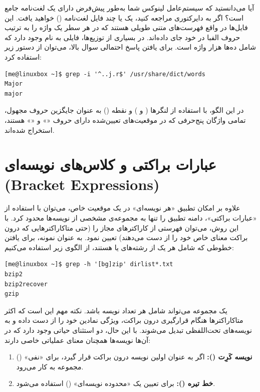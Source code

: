آیا می‌دانستید که سیستم‌عامل لینوکس شما به‌طور پیش‌فرض دارای یک لغت‌نامه جامع است؟ اگر به دایرکتوری  مراجعه کنید، یک یا چند فایل لغت‌نامه () خواهید یافت. این فایل‌ها در واقع فهرست‌های متنی طویلی هستند که در هر سطر یک واژه را به ترتیب حروف الفبا در خود جای داده‌اند. در بسیاری از توزیع‌ها، فایلی به نام  وجود دارد که شامل ده‌ها هزار واژه است. برای یافتن پاسخ احتمالی سوال بالا، می‌توان از دستور زیر استفاده کرد:

\begin{latin}
\begin{lstlisting}
[me@linuxbox ~]$ grep -i '^..j.r$' /usr/share/dict/words
Major
major
\end{lstlisting}
\end{latin}

در این الگو، با استفاده از لنگرها (\cmd{\^{}} و \cmd{\$}) و نقطه () به عنوان جایگزین حروف مجهول، تمامی واژگان پنج‌حرفی که در موقعیت‌های تعیین‌شده دارای حروف «» و «» هستند، استخراج شده‌اند.

\section{عبارات براکتی و کلاس‌های نویسه‌ای (Bracket Expressions)}

علاوه بر امکان تطبیق «هر نویسه‌ای» در یک موقعیت خاص، می‌توان با استفاده از «عبارات براکتی»، دامنه تطبیق را تنها به مجموعه‌ی مشخصی از نویسه‌ها محدود کرد. با این روش، می‌توان فهرستی از کاراکترهای مجاز را (حتی متاکاراکترهایی که درون براکت معنای خاص خود را از دست می‌دهند) تعیین نمود. به عنوان نمونه، برای یافتن خطوطی که شامل هر یک از رشته‌های  یا  هستند، از الگوی زیر استفاده می‌کنیم:

\begin{latin}
\begin{lstlisting}
[me@linuxbox ~]$ grep -h '[bg]zip' dirlist*.txt
bzip2
bzip2recover
gzip
\end{lstlisting}
\end{latin}

یک مجموعه می‌تواند شامل هر تعداد نویسه باشد. نکته مهم این است که اکثر متاکاراکترها هنگام قرارگیری درون براکت، ویژگی نمادین خود را از دست داده و به نویسه‌های تحت‌اللفظی تبدیل می‌شوند. با این حال، دو استثنای حیاتی وجود دارد که در آن‌ها نویسه‌ها همچنان معنای عملیاتی خاصی دارند:

\begin{enumerate}
  \item \textbf{نویسه کَرِت (\cmd{\^{}}):} اگر به عنوان اولین نویسه درون براکت قرار گیرد، برای «نفی» () مجموعه به کار می‌رود.
  \item \textbf{خط تیره (\cmd{-}):} برای تعیین یک «محدوده نویسه‌ای» () استفاده می‌شود.
\end{enumerate}

